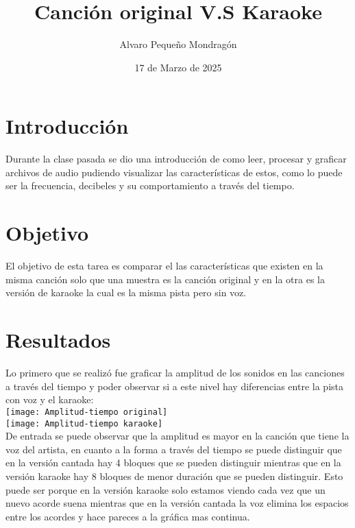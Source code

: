 \documentclass{article}
\title{\textbf{Canción original V.S Karaoke}}
\author{Alvaro Pequeño Mondragón}
\date{17 de Marzo de 2025}
\begin{document}
	
	\maketitle
	
	\section*{Introducción}
	
	Durante la clase pasada se dio una introducción de como leer, procesar y graficar archivos de audio pudiendo visualizar las características de estos, como lo puede ser la frecuencia, decibeles y su comportamiento a través del tiempo.  \\
	
	\section*{Objetivo}
	
	El objetivo de esta tarea es comparar el las características que existen en la misma canción solo que una muestra es la canción original y en la otra es la versión de karaoke la cual es la misma pista pero sin voz.\\
	
	\section*{Resultados}
	
	Lo primero que se realizó fue graficar la amplitud de los sonidos en las canciones a través del tiempo y poder observar si a este nivel hay diferencias entre la pista con voz y el karaoke:\\
	
	\texttt{[image: Amplitud-tiempo original]} \\
	\texttt{[image: Amplitud-tiempo karaoke]} \\
	
	De entrada se puede observar que la amplitud es mayor en la canción que tiene la voz del artista, en cuanto a la forma a través del tiempo se puede distinguir que en la versión cantada hay 4 bloques que se pueden distinguir mientras que en la versión karaoke hay 8 bloques de menor duración que se pueden distinguir. Esto puede ser porque en la versión karaoke solo estamos viendo cada vez que un nuevo acorde suena mientras que en la versión cantada la voz elimina los espacios entre los acordes y hace pareces a la gráfica mas continua.\\
	
\end{document}
